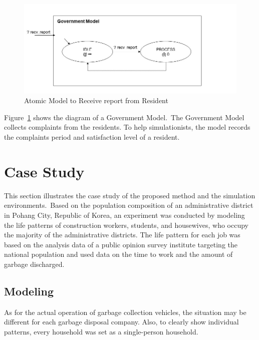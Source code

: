 \documentclass{scsSimAUDPaperFormat}
\begin{document}
\begin{figure}[!ht]
    \centering
    \includegraphics[width=1.0\columnwidth]{fig/government_model.jpg}
    \caption{Atomic Model to Receive report from Resident}
    \label{Fig:Governmentmodel}
\end{figure}

Figure~\ref{Fig:Governmentmodel} shows the diagram of a Government Model.~The Government Model collects complaints from the residents. To help simulationists, the model records the complaints period and satisfaction level of a resident. 




\section{Case Study}
This section illustrates the case study of the proposed method and the simulation environments.~Based on the population composition of an administrative district in Pohang City, Republic of Korea, an experiment was conducted by modeling the life patterns of construction workers, students, and housewives, who occupy the majority of the administrative districts. The life pattern for each job was based on the analysis data \cite{gallup2013} of a public opinion survey institute targeting the national population and used data on the time to work and the amount of garbage discharged.
\subsection{Modeling}
As for the actual operation of garbage collection vehicles, the situation may be different for each garbage disposal company. Also, to clearly show individual patterns, every household was set as a single-person household.
\end{document}
